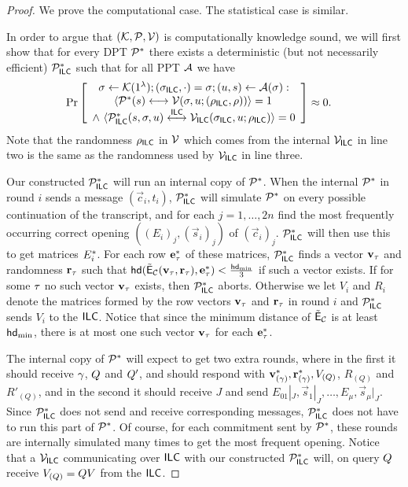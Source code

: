     \begin{proof}
We prove the computational case. The statistical case is similar.%


In order to argue that $(\mathcal{K},\mathcal{P},\mathcal{V})$ is computationally knowledge sound, we will first show that for every DPT $\mathcal{P}^*$ there exists a deterministic (but not necessarily efficient) $\mathcal{P}_{\mathsf{ILC}}^*$ such that for all PPT $\mathcal{A}$ we have 
\begin{align}\Pr&\left[\begin{array}{c} \mathsf{\sigma}\gets \mathcal{K}(1^{\lambda});(\mathsf{\sigma}_{\mathsf{ILC}},\cdot)=\mathsf{\sigma};(u,s) \gets \mathcal{A}(\mathsf{\sigma}):\\
\langle \mathcal{P}^*(s)\longleftrightarrow\mathcal{V}(\mathsf{\sigma},u;(\rho_{\mathsf{ILC}},\rho))\rangle = 1 \, \\
\wedge~~\langle \mathcal{P}_{\mathsf{ILC}}^*(s,\mathsf{\sigma},u)\overset{\mathsf{ILC}}{\longleftrightarrow}\mathcal{V}_{\mathsf{ILC}}(\mathsf{\sigma}_{\mathsf{ILC}},u;\rho_{\mathsf{ILC}})\rangle = 0
\end{array}
\right]\approx 0.\label{zkip:ineq:pilcstar}
\end{align}
Note that the randomness $\rho_{\mathsf{ILC}}$ in $\mathcal{V}$ which comes from the internal $\mathcal{V}_{\mathsf{ILC}}$ in line two is the same as the randomness used by $\mathcal{V}_{\mathsf{ILC}}$ in line three. 

Our constructed $\mathcal{P}_{\mathsf{ILC}}^*$ will run an internal copy of $\mathcal{P}^*$.
When the internal $\mathcal{P}^*$ in round $i$ sends a message $(\vec{c}_i,t_i)$, $\mathcal{P}_{\mathsf{ILC}}^*$ will simulate $\mathcal{P}^*$ on every possible continuation of the transcript, and for each $j=1,\ldots,2n$ find the most frequently occurring correct opening $((E_i)_j,(\vec{s}_i)_j)$ of $(\vec{c}_i)_j$. $\mathcal{P}_{\mathsf{ILC}}^*$ will then use this to get matrices $E^*_i$. For each row $\mathbf{e}^*_\tau$ of these matrices, $\mathcal{P}_{\mathsf{ILC}}^*$ finds a vector ${\mathbf{v}}_{\tau}$ and randomness $\mathbf{r}_\tau$ such that $\mathsf{hd}(\tilde{\mathsf{E}}_{\mathcal{C}}({\mathbf{v}}_\tau,\mathbf{r}_\tau),\mathbf{e}^*_\tau)<\frac{\mathsf{hd}_{\mathrm{min}}}{3}$ if such a vector exists.
If for some $\tau$ no such vector ${\mathbf{v}}_\tau$ exists, then $\mathcal{P}_{\mathsf{ILC}}^*$ aborts. Otherwise we let $V_i$ and $R_i$ denote the matrices formed by the row vectors $\mathbf{v}_\tau$ and $\mathbf{r}_\tau$ in round $i$ and $\mathcal{P}_{\mathsf{ILC}}^*$ sends $V_i$ to the $\mathsf{ILC}$.
Notice that since the minimum distance of $\tilde{\mathsf{E}}_{\mathcal{C}}$ is at least $\mathsf{hd}_{\mathrm{min}}$, there is at most one such vector ${\mathbf{v}}_\tau$ for each $\mathbf{e}^*_\tau$. 

The internal copy of $\mathcal{P}^*$ will expect to get two extra rounds, where in the first it should receive ${\mathbf{\gamma}}$, $Q$ and $Q'$, and should respond with ${\mathbf{v}}_{({\mathbf{\gamma}})}^*,\mathbf{r}_{({\mathbf{\gamma}})}^*,V_{(Q)}$, $R_{(Q)}$ and $R'_{(Q)}$, and in the second it should receive $J$ and send $E_{01}|_J,\vec{s}_1|_J,\ldots,E_\mu,\vec{s}_\mu|_J$.
Since $\mathcal{P}_{\mathsf{ILC}}^*$ does not send and receive corresponding messages, $\mathcal{P}_{\mathsf{ILC}}^*$ does not have to run this part of $\mathcal{P}^*$. Of course, for each commitment sent by $\mathcal{P}^*$, these rounds are internally simulated many times to get the most frequent opening. Notice that a $\mathcal{V}_{\mathsf{ILC}}$ communicating over $\mathsf{ILC}$ with our constructed $\mathcal{P}_{\mathsf{ILC}}^*$ will, on query $Q$ receive $V_{(Q)}=Q V$ from the $\mathsf{ILC}$.




\end{proof}
